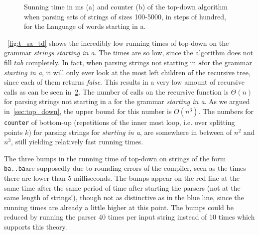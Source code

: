 \begin{figure}[!ht]
\begin{subfigure}[b]{0.48\textwidth}
        \caption{}
        \label{fig:c_sa_td}
    \end{subfigure}
    \caption{Sunning time in ms (a) and counter (b) of the top-down algorithm when parsing sets of strings of sizes 100-5000, in steps of hundred, for the Language of words starting in a.}
\end{figure}

~\cref{fig:t_sa_td} shows the incredibly low running times of top-down on the grammar \textit{strings starting in a}.
The times are so low, since the algorithm does not fill $tab$ completely.
In fact, when parsing strings not starting in \texttt{a}for the grammar \textit{starting in a}, it will only ever look at the most left children of the recursive tree, since each of them returns \textit{false}.
This results in a very low amount of recursive calls as can be seen in~\cref{fig:c_sa_td}.
The number of calls on the recursive function is $\Theta(n)$ for parsing strings not starting in a for the grammar \textit{starting in a}.
As we argued in~\cref{sec:top_down}, the upper bound for this number is $O(n^3)$.
The numbers for \texttt{counter} of bottom-up (repetitions of the inner most loop, i.e. over splitting points $k$) for parsing strings for \textit{starting in a}, are somewhere in between of $n^2$ and $n^3$, still yielding relatively fast running times.

The three bumps in the running time of top-down on strings of the form \texttt{ba..ba}are supposedly due to rounding errors of the compiler, seen as the times there are lower than 5 milliseconds.
The bumps appear on the red line at the same time after the same period of time after starting the parsers (not at the same length of strings!), though not as distinctive as in the blue line, since the running times are already a little higher at this point.
The bumps could be reduced by running the parser 40 times per input string instead of 10 times which supports this theory.

